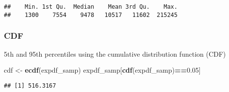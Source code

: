 \documentclass[]{article}
\newenvironment{Shaded}{\begin{snugshade}}{\end{snugshade}}
\newcommand{\KeywordTok}[1]{\textcolor[rgb]{0.13,0.29,0.53}{\textbf{#1}}}
\newcommand{\FloatTok}[1]{\textcolor[rgb]{0.00,0.00,0.81}{#1}}
\newcommand{\StringTok}[1]{\textcolor[rgb]{0.31,0.60,0.02}{#1}}
\newcommand{\OperatorTok}[1]{\textcolor[rgb]{0.81,0.36,0.00}{\textbf{#1}}}
\newcommand{\NormalTok}[1]{#1}
\begin{document}
\begin{verbatim}
##    Min. 1st Qu.  Median    Mean 3rd Qu.    Max. 
##    1300    7554    9478   10517   11602  215245
\end{verbatim}

\subsubsection{CDF}\label{cdf}

5th and 95th percentiles using the cumulative distribution function
(CDF)

\begin{Shaded}
\begin{Highlighting}[]
\NormalTok{cdf <-}\StringTok{ }\KeywordTok{ecdf}\NormalTok{(expdf_samp)}
\NormalTok{expdf_samp[}\KeywordTok{cdf}\NormalTok{(expdf_samp)}\OperatorTok{==}\FloatTok{0.05}\NormalTok{]}
\end{Highlighting}
\end{Shaded}

\begin{verbatim}
## [1] 516.3167
\end{verbatim}
\end{document}
